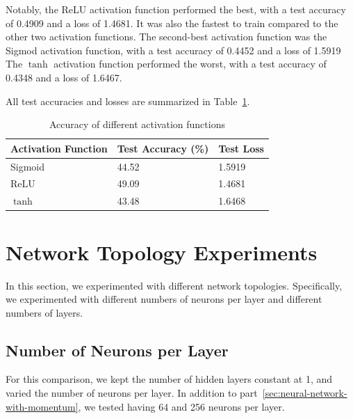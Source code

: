 \documentclass{article}
\begin{document}
    Notably, the ReLU activation function performed the best, with a test accuracy of 0.4909 and a loss of 1.4681.
    It was also the fastest to train compared to the other two activation functions.
    The second-best activation function was the Sigmod activation function, with a test accuracy of 0.4452 and a loss of 1.5919
    The $\tanh$ activation function performed the worst, with a test accuracy of 0.4348 and a loss of 1.6467.

    All test accuracies and losses are summarized in Table~\ref{tab:table1}.


    \begin{table}[H]
        \centering
        \caption{Accuracy of different activation functions}
        \label{tab:table1}
        \begin{tabular}{l|l|l}
            \toprule
            Activation Function & Test Accuracy (\%) & Test Loss \\
            \midrule
            Sigmoid             & 44.52              & 1.5919    \\
            ReLU                & 49.09              & 1.4681    \\
            $\tanh$             & 43.48              & 1.6468    \\
            \bottomrule
        \end{tabular}
    \end{table}


    \section{Network Topology Experiments}\label{sec:network-topology-experiments}

    In this section, we experimented with different network topologies.
    Specifically, we experimented with different numbers of neurons per layer and different numbers of layers.

    \subsection{Number of Neurons per Layer}\label{subsec:number-of-neurons-per-layer}
    For this comparison, we kept the number of hidden layers constant at 1, and varied the number of neurons per layer.
    In addition to part~\ref{sec:neural-network-with-momentum}, we tested having 64 and 256 neurons per layer.
\end{document}
